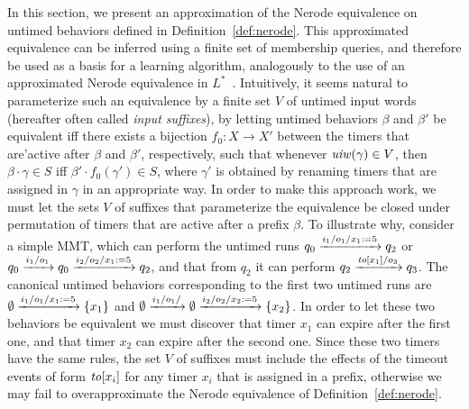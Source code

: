 In this section, we present an approximation of the Nerode equivalence on
untimed behaviors
defined in Definition~\ref{def:nerode}. This
approximated equivalence can be inferred using a finite set of membership
queries, and therefore be used as a basis for a learning algorithm,
analogously to the use of an approximated Nerode equivalence in
$L^*$~\cite{Ang87}.
Intuitively, it seems natural to parameterize such an equivalence by
a finite set $V$ of untimed input words (hereafter often
called {\em input suffixes}), by letting
untimed behaviors $\beta$ and $\beta'$ be equivalent
iff there exists a bijection $f_0 : X \to X'$ between the timers that are'active after $\beta$ and $\beta'$, respectively, such that whenever
$\mathit{uiw}(\gamma) \in V$, then
$\beta\cdot\gamma \in S$ iff 
$\beta'\cdot f_0(\gamma') \in S$, where $\gamma'$ is obtained by
renaming timers that are assigned in $\gamma$ in an appropriate way.
In order to make this approach work, we must let the sets $V$ of suffixes that
parameterize the equivalence be
closed under permutation of timers that are active after a prefix $\beta$.
To illustrate why, consider a simple MMT, which can perform the untimed runs
\(
q_0 \xrightarrow{i_1/o_1/x_1:= 5} q_2
\)
or
\(
q_0 \xrightarrow{i_1/o_1} q_0 \xrightarrow{i_2/o_2/x_1:= 5} q_2
\),
and that from $q_2$ it can perform
\(
q_2 \xrightarrow{\mathit{to}[x_1]/o_3} q_3
\).
The canonical untimed behaviors corresponding to the first two
untimed runs are
\(
\emptyset \xrightarrow{i_1/o_1/x_1:= 5} \lbrace x_1\rbrace
\)
and
\(
\emptyset \xrightarrow{i_1/o_1/} \emptyset \xrightarrow{i_2/o_2/x_2:= 5} \lbrace x_2\rbrace
\).
In order to let these two behaviors be equivalent we must discover that
timer $x_1$ can expire after the first one, and that
timer $x_2$ can expire after the second one. Since these two timers
have the same rules, the set $V$ of suffixes must
include the effects of the timeout events of form $\mathit{to}[x_i]$ for any
timer $x_i$ that is assigned in a prefix, otherwise we
may fail to overapproximate the Nerode equivalence of Definition~\ref{def:nerode}.

